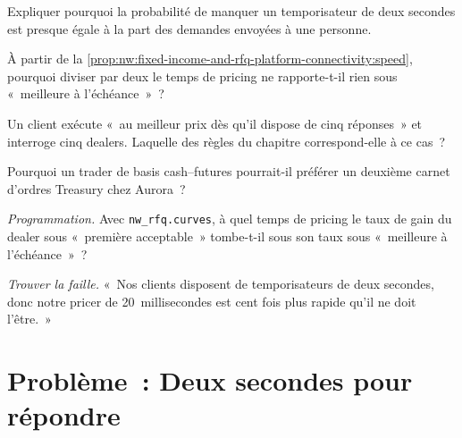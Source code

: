 \begin{exercise}[$\star$]\label{exo:nw:fixed-income-and-rfq-platform-connectivity:3}
Expliquer pourquoi la probabilité de manquer un temporisateur de deux secondes est presque égale à la part des demandes envoyées à une personne.
\end{exercise}

\begin{exercise}[$\star\star$]\label{exo:nw:fixed-income-and-rfq-platform-connectivity:4}
À partir de la \cref{prop:nw:fixed-income-and-rfq-platform-connectivity:speed}, pourquoi diviser par deux le temps de pricing ne rapporte-t-il rien sous «~meilleure à
l'échéance~»~?
\end{exercise}

\begin{exercise}[$\star\star$]\label{exo:nw:fixed-income-and-rfq-platform-connectivity:5}
Un client exécute «~au meilleur prix dès qu'il dispose de cinq réponses~» et interroge cinq dealers. Laquelle des règles du chapitre correspond-elle à ce cas~?
\end{exercise}

\begin{exercise}[$\star\star$]\label{exo:nw:fixed-income-and-rfq-platform-connectivity:6}
Pourquoi un trader de basis cash--futures pourrait-il préférer un deuxième carnet d'ordres Treasury chez Aurora~?
\end{exercise}

\begin{exercise}[$\star\star\star$]\label{exo:nw:fixed-income-and-rfq-platform-connectivity:7}
\emph{Programmation.} Avec \texttt{nw\_rfq.curves}, à quel temps de pricing le taux de gain du dealer sous «~première acceptable~» tombe-t-il
sous son taux sous «~meilleure à l'échéance~»~?
\end{exercise}

\begin{exercise}[$\star\star\star$]\label{exo:nw:fixed-income-and-rfq-platform-connectivity:8}
\emph{Trouver la faille.} «~Nos clients disposent de temporisateurs de deux secondes, donc notre pricer de 20~millisecondes est cent fois plus rapide qu'il ne doit l'être.~»
\end{exercise}

\section{Problème~: Deux secondes pour répondre}

